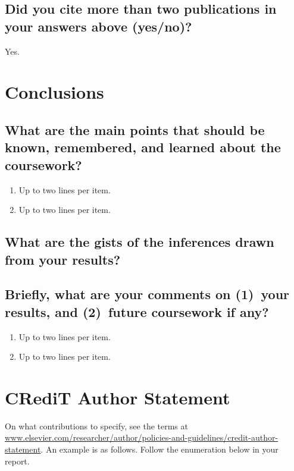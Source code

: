 \subsection{Did you cite more than two publications in your answers above (yes/no)?}
Yes.	



















\section{Conclusions}
\label{sec:conc}

\subsection{What are the main points that should be known, remembered, and learned about the coursework?}
\begin{enumerate}
\item Up to two lines per item.
\item Up to two lines per item.
\end{enumerate}

\subsection{What are the gists of the inferences drawn from your results?}

\subsection{Briefly, what are your comments on (1)~your results, and  (2)~future coursework if any?}
\begin{enumerate}
\item Up to two lines per item.
\item Up to two lines per item.
\end{enumerate}	



\section{CRediT Author Statement}

On what contributions to specify, see the terms at \url{www.elsevier.com/researcher/author/policies-and-guidelines/credit-author-statement}.  An example is as follows.  Follow the enumeration below in your report.

